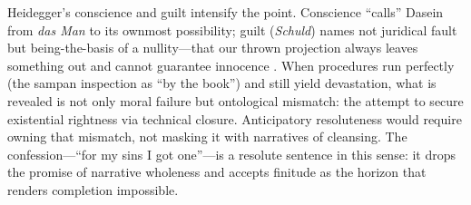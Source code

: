 Heidegger's conscience and guilt intensify the point. Conscience ``calls'' Dasein from \emph{das
	Man} to its ownmost possibility; guilt (\emph{Schuld}) names not juridical fault but
being-the-basis of a nullity—that our thrown projection always leaves something out and cannot
guarantee innocence \parencite[\S\S 57--60, pp.~311--354]{HeideggerBT1962}. When procedures run
perfectly (the sampan inspection as ``by the book'') and still yield devastation, what is
revealed is not only moral failure but ontological mismatch: the attempt to secure existential
rightness via technical closure. Anticipatory resoluteness would require owning that mismatch,
not masking it with narratives of cleansing. The confession—``for my sins I got one''—is a
resolute sentence in this sense: it drops the promise of narrative wholeness and accepts
finitude as the horizon that renders completion impossible.
